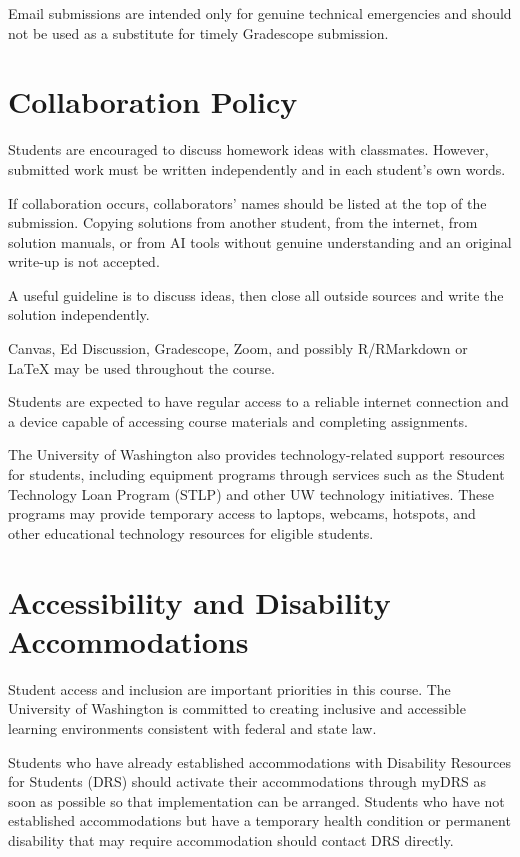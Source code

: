 \documentclass[11pt]{article}
\begin{document}
Email submissions are intended only for genuine technical emergencies and should not be used as a substitute for timely Gradescope submission.

\section{Collaboration Policy}

Students are encouraged to discuss homework ideas with classmates. However, submitted work must be written independently and in each student's own words.

If collaboration occurs, collaborators' names should be listed at the top of the submission. Copying solutions from another student, from the internet, from solution manuals, or from AI tools without genuine understanding and an original write-up is not accepted.

A useful guideline is to discuss ideas, then close all outside sources and write the solution independently.


Canvas, Ed Discussion, Gradescope, Zoom, and possibly R/RMarkdown or \LaTeX{} may be used throughout the course. 



Students are expected to have regular access to a reliable internet connection and a device capable of accessing course materials and completing assignments.


The University of Washington also provides technology-related support resources for students, including equipment programs through services such as the Student Technology Loan Program (STLP) and other UW technology initiatives. These programs may provide temporary access to laptops, webcams, hotspots, and other educational technology resources for eligible students.


\section{Accessibility and Disability Accommodations}

Student access and inclusion are important priorities in this course. The University of Washington is committed to creating inclusive and accessible learning environments consistent with federal and state law.

Students who have already established accommodations with Disability Resources for Students (DRS) should activate their accommodations through myDRS as soon as possible so that implementation can be arranged. Students who have not established accommodations but have a temporary health condition or permanent disability that may require accommodation should contact DRS directly.
\end{document}
